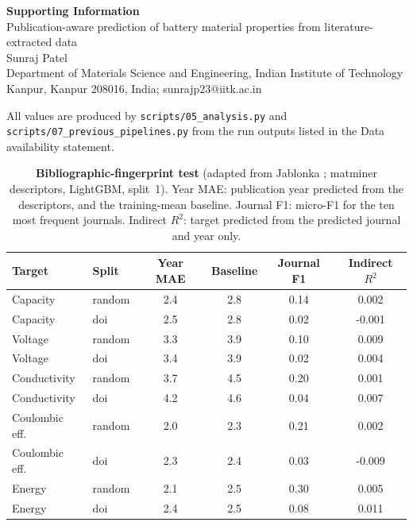 \documentclass[11pt]{article}
\begin{document}
\begin{center}
{\Large\bfseries Supporting Information}\\[4pt]
{\large Publication-aware prediction of battery material properties from literature-extracted data}\\[4pt]
Sunraj Patel\\[2pt]
{\small Department of Materials Science and Engineering, Indian Institute of Technology Kanpur, Kanpur 208016, India; sunrajp23@iitk.ac.in}
\end{center}

All values are produced by \texttt{scripts/05\_analysis.py} and \texttt{scripts/07\_previous\_pipelines.py} from the run outputs listed in the Data availability statement.

\begin{table}[htbp]
    \centering\small
    \caption{\textbf{Bibliographic-fingerprint test} (adapted from Jablonka \cite{jablonka2026clever}; matminer descriptors, LightGBM, split~1). Year MAE: publication year predicted from the descriptors, and the training-mean baseline. Journal F1: micro-F1 for the ten most frequent journals. Indirect $R^2$: target predicted from the predicted journal and year only.}
    \label{tab:clever}
    \begin{tabular}{@{}llcccc@{}}
        \toprule
        Target & Split & Year MAE & Baseline & Journal F1 & Indirect $R^2$ \\
        \midrule
        Capacity & random & 2.4 & 2.8 & 0.14 & 0.002 \\
        Capacity & doi & 2.5 & 2.8 & 0.02 & -0.001 \\
        Voltage & random & 3.3 & 3.9 & 0.10 & 0.009 \\
        Voltage & doi & 3.4 & 3.9 & 0.02 & 0.004 \\
        Conductivity & random & 3.7 & 4.5 & 0.20 & 0.001 \\
        Conductivity & doi & 4.2 & 4.6 & 0.04 & 0.007 \\
        Coulombic eff. & random & 2.0 & 2.3 & 0.21 & 0.002 \\
        Coulombic eff. & doi & 2.3 & 2.4 & 0.03 & -0.009 \\
        Energy & random & 2.1 & 2.5 & 0.30 & 0.005 \\
        Energy & doi & 2.4 & 2.5 & 0.08 & 0.011 \\
        \bottomrule
    \end{tabular}
\end{table}
\end{document}
